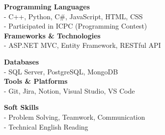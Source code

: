 \documentclass[10pt,a4paper]{article}
\begin{document}
\begin{minipage}[t]{0.5\textwidth}
    \textbf{\small Programming Languages} \\[1pt]
    - C++, Python, C\#, JavaScript, HTML, CSS \\
    - Participated in ICPC (Programming Contest) \\[4pt]
    
    \textbf{\small Frameworks \& Technologies} \\[1pt]
    - ASP.NET MVC, Entity Framework, RESTful API
\end{minipage}%
\begin{minipage}[t]{0.5\textwidth}
    \textbf{\small Databases} \\[1pt]
    - SQL Server, PostgreSQL, MongoDB \\[4pt]

    \textbf{\small Tools \& Platforms} \\[1pt]
    - Git, Jira, Notion, Visual Studio, VS Code
\end{minipage}

\vspace{8pt}

\begin{minipage}[t]{0.5\textwidth}
    \textbf{\small Soft Skills} \\[1pt]
    - Problem Solving, Teamwork, Communication \\
    - Technical English Reading
\end{minipage}
\end{document}
